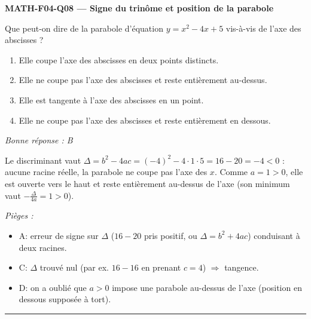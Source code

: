 \documentclass[11pt,a4paper]{article}
\begin{document}
\noindent\textbf{MATH-F04-Q08 --- Signe du trinôme et position de la parabole}\par
Que peut-on dire de la parabole d'équation $y=x^2-4x+5$ vis-à-vis de l'axe des abscisses ?
\begin{enumerate}[label=\Alph*)]
\item Elle coupe l'axe des abscisses en deux points distincts.
\item Elle ne coupe pas l'axe des abscisses et reste entièrement au-dessus.
\item Elle est tangente à l'axe des abscisses en un point.
\item Elle ne coupe pas l'axe des abscisses et reste entièrement en dessous.
\end{enumerate}
\textit{Bonne réponse : B}\par
Le discriminant vaut $\Delta=b^2-4ac=(-4)^2-4\cdot 1\cdot 5=16-20=-4<0$ : aucune racine réelle, la parabole ne coupe pas l'axe des $x$. Comme $a=1>0$, elle est ouverte vers le haut et reste entièrement au-dessus de l'axe (son minimum vaut $-\tfrac{\Delta}{4a}=1>0$).\par
\textit{Pièges :}
\begin{itemize}
\item A: erreur de signe sur $\Delta$ ($16-20$ pris positif, ou $\Delta=b^2+4ac$) conduisant à deux racines.
\item C: $\Delta$ trouvé nul (par ex. $16-16$ en prenant $c=4$) $\Rightarrow$ tangence.
\item D: on a oublié que $a>0$ impose une parabole au-dessus de l'axe (position en dessous supposée à tort).
\end{itemize}
\vspace{8pt}\hrule\vspace{8pt}
\end{document}
